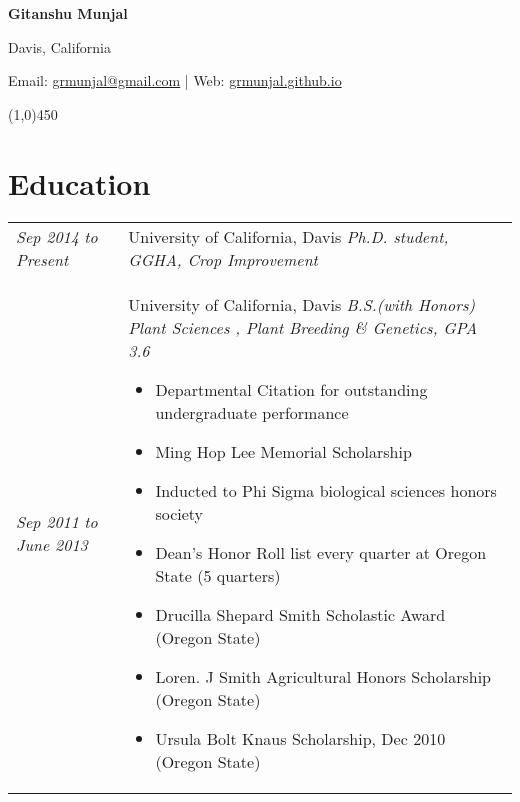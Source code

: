 ﻿\documentclass[a4paper]{article}
\def\name{Gitanshu Munjal}
\begin{document}
\centerline{\huge \bf \name}
\vspace{0.07in}
\centerline{Davis, California}
\centerline{Email: \href{mailto:grmunjal@gmail.com}{grmunjal@gmail.com}  |  Web: \href{http://grmunjal.github.io/}{grmunjal.github.io}}

\begin{center}
\line(1,0){450}
\end{center}


\section*{Education}
\begin{tabular}{p{3cm} p{14cm}}
\vspace{0pt} 
\textit{Sep 2014}\newline
\textit{to}\newline
\textit{Present}\newline
& 
\vspace{0pt}
{\Large University of California, Davis}\newline
\textit{Ph.D. student, GGHA, Crop Improvement}
%
\\
%
\vspace{0pt} 
\textit{Sep 2011}\newline
\textit{to}\newline
\textit{June 2013}\newline
& 
\vspace{0pt}
{\Large University of California, Davis}\newline
\textit{B.S.(with Honors) Plant Sciences , Plant Breeding \& Genetics, GPA 3.6}
\begin{itemize}[noitemsep,topsep=0pt]
  \item Departmental Citation for outstanding undergraduate performance
  \item Ming Hop Lee Memorial Scholarship
  \item Inducted to Phi Sigma biological sciences honors society
  \item Dean's Honor Roll list every quarter at Oregon State (5 quarters)
  \item Drucilla Shepard Smith Scholastic Award (Oregon State)
  \item Loren. J Smith Agricultural Honors Scholarship (Oregon State)
  \item Ursula Bolt Knaus Scholarship, Dec 2010 (Oregon State)
\end{itemize}
\end{tabular}
\end{document}
